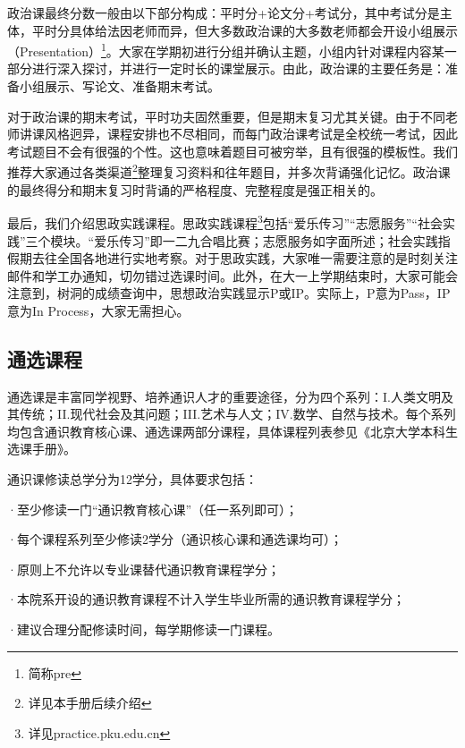 \documentclass[11pt,oneside]{book}
\begin{document}
政治课最终分数一般由以下部分构成：平时分+论文分+考试分，其中考试分是主体，平时分具体给法因老师而异，但大多数政治课的大多数老师都会开设小组展示（Presentation）\footnote{简称pre}。大家在学期初进行分组并确认主题，小组内针对课程内容某一部分进行深入探讨，并进行一定时长的课堂展示。由此，政治课的主要任务是：准备小组展示、写论文、准备期末考试。

\vspace{20pt}

对于政治课的期末考试，平时功夫固然重要，但是期末复习尤其关键。由于不同老师讲课风格迥异，课程安排也不尽相同，而每门政治课考试是全校统一考试，因此考试题目不会有很强的个性。这也意味着题目可被穷举，且有很强的模板性。我们推荐大家通过各类渠道\footnote{详见本手册后续介绍}整理复习资料和往年题目，并多次背诵强化记忆。政治课的最终得分和期末复习时背诵的严格程度、完整程度是强正相关的。

\vspace{20pt}

最后，我们介绍思政实践课程。思政实践课程\footnote{详见practice.pku.edu.cn}包括“爱乐传习”“志愿服务”“社会实践”三个模块。“爱乐传习”即一二九合唱比赛；志愿服务如字面所述；社会实践指假期去往全国各地进行实地考察。对于思政实践，大家唯一需要注意的是时刻关注邮件和学工办通知，切勿错过选课时间。此外，在大一上学期结束时，大家可能会注意到，树洞的成绩查询中，思想政治实践显示P或IP。实际上，P意为Pass，IP意为In Process，大家无需担心。

\subsection{通选课程}
通选课是丰富同学视野、培养通识人才的重要途径，分为四个系列：I.人类文明及其传统；II.现代社会及其问题；III.艺术与人文；IV.数学、自然与技术。每个系列均包含通识教育核心课、通选课两部分课程，具体课程列表参见《北京大学本科生选课手册》。

\vspace{20pt}

通识课修读总学分为12学分，具体要求包括：

·至少修读一门“通识教育核心课”（任一系列即可）；

·每个课程系列至少修读2学分（通识核心课和通选课均可）；

·原则上不允许以专业课替代通识教育课程学分；

·本院系开设的通识教育课程不计入学生毕业所需的通识教育课程学分；

·建议合理分配修读时间，每学期修读一门课程。

\vspace{20pt}
\end{document}
